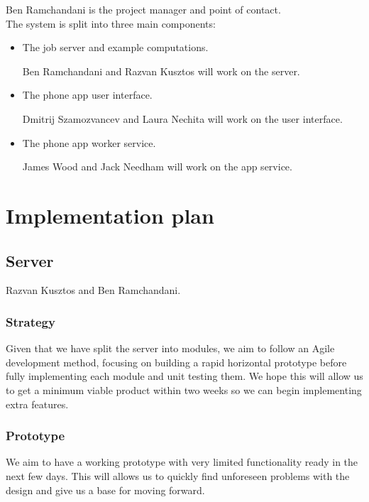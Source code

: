 \documentclass[
  twoside,
  10pt, a4paper
]{article}
\begin{document}
Ben Ramchandani is the project manager and point of contact.\\

The system is split into three main components:
\begin{itemize}
\item The job server and example computations.

Ben Ramchandani and Razvan Kusztos will work on the server.

\item The phone app user interface.

Dmitrij Szamozvancev and Laura Nechita will work on the user interface.

\item The phone app worker service.

James Wood and Jack Needham will work on the app service.
\end{itemize}



\newpage
\section{Implementation plan}


\subsection{Server}

Razvan Kusztos and Ben Ramchandani.

\subsubsection{Strategy}

Given that we have split the server into modules, we aim to follow an Agile development method, focusing on building a rapid horizontal prototype before fully implementing each module
and unit testing them. We hope this will allow us to get a minimum viable product within two weeks so we can begin implementing extra features.

\subsubsection{Prototype}

We aim to have a working prototype with very limited functionality ready in the next few days.
This will allows us to quickly find unforeseen problems with the design and give us a base for moving forward.\\
\end{document}
